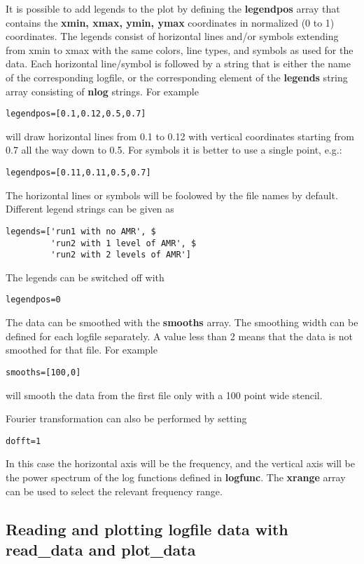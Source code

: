 \documentclass{article}
\begin{document}
It is possible to add legends to the plot by defining the {\bf legendpos}
array that contains the {\bf xmin, xmax, ymin, ymax} coordinates 
in normalized (0 to 1) coordinates. The legends consist of 
horizontal lines and/or symbols extending from xmin to xmax with the 
same colors, line types, and symbols as used for the data. 
Each horizontal line/symbol is followed by a string that is either
the name of the corresponding logfile, or the corresponding
element of the {\bf legends} string array consisting of {\bf nlog} strings.
For example
\begin{verbatim}
legendpos=[0.1,0.12,0.5,0.7]
\end{verbatim}
will draw horizontal lines from 0.1 to 0.12 with vertical coordinates
starting from 0.7 all the way down to 0.5. For symbols it is better
to use a single point, e.g.:
\begin{verbatim}
legendpos=[0.11,0.11,0.5,0.7]
\end{verbatim}
The horizontal lines or symbols will be foolowed by the file names by default.
Different legend strings can be given as
\begin{verbatim}
legends=['run1 with no AMR', $
         'run2 with 1 level of AMR', $
         'run2 with 2 levels of AMR']
\end{verbatim}
The legends can be switched off with 
\begin{verbatim}
legendpos=0
\end{verbatim}
The data can be smoothed with the {\bf smooths} array. 
The smoothing width can be defined for each logfile separately. 
A value less than 2 means that the data is not smoothed for that file.
For example
\begin{verbatim}
smooths=[100,0]
\end{verbatim}
will smooth the data from the first file only with a 100 point wide stencil.

Fourier transformation can also be performed by setting
\begin{verbatim}
dofft=1
\end{verbatim}
In this case the horizontal axis will be the frequency, and the
vertical axis will be the power spectrum of the log functions 
defined in {\bf logfunc}. The {\bf xrange} array 
can be used to select the relevant frequency range.

\subsection{Reading and plotting logfile data with read\_data and plot\_data}
\end{document}
